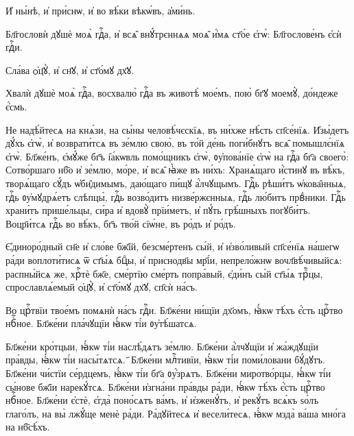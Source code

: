  И҆ ны́нѣ, и҆ при́снѡ, и҆ во вѣ́ки вѣкѡ́въ, а҆ми́нь. 
%

\hKv Бл҃гословѝ дꙋшѐ моѧ̀ гдⷭ҇а, и҆ всѧ̑ внꙋ́трєннѧѧ моѧ̑  и҆́мѧ ст҃о́е є҆гѡ̀: \hKv Бл҃гослове́нъ є҆сѝ гдⷭ҇и. 


\hKv Сла́ва ѻ҆ц҃ꙋ̀, и҆ сн҃ꙋ, и҆ ст҃о́мꙋ дх҃ꙋ.  

\hKv Хвалѝ дꙋшѐ моѧ̀ гдⷭ҇а, восхвалю̀ гдⷭ҇а въ животѣ̀ мое́мъ,  пою̀ бг҃ꙋ моемꙋ̀, до́ндеже є҆́смь. 
%

\hKv Не надѣ́йтесѧ на кнѧ́зи, на сы́ны человѣ́чєскїѧ, въ  ни́хже нѣ́сть сп҃се́нїѧ.  
\hKv И҆зы́детъ дꙋ́хъ є҆гѡ̀, и҆ возврати́тсѧ въ зе́млю  свою̀, въ то́й де́нь поги́бнꙋтъ всѧ̑ помышлє́нїѧ є҆гѡ̀.  
\hKv Бл҃же́нъ, є҆мꙋ́же бг҃ъ і҆а́кѡвль помо́щникъ є҆гѡ̀,  ᲂу҆пова́нїе є҆гѡ̀ на гдⷭ҇а бг҃а своего̀: 
\hKv Сотво́ршаго  нб҃о и҆ зе́млю, мо́ре, и҆ всѧ̑ ꙗ҆̀же въ ни́хъ: 
\hKv Хранѧ́щаго и҆́стинꙋ въ вѣ́къ, творѧ́щаго сꙋ́дъ ѡ҆би̑димымъ,  даю́щаго пи́щꙋ а҆́лчꙋщымъ. 
\hKv Гдⷭ҇ь рѣши́тъ ѡ҆кова̑нныѧ,  гдⷭ҇ь ᲂу҆мꙋдрѧ́етъ слѣпцы̀, гдⷭ҇ь возво́дитъ  низве́ржєнныѧ, гдⷭ҇ь лю́битъ првⷣники.  
\hKv Гдⷭ҇ь  храни́тъ прише́льцы, си́ра и҆ вдовꙋ̀ прїи́метъ, и҆ пꙋ́ть  грѣ́шныхъ погꙋби́тъ. 
\hKv Воцр҃и́тсѧ гдⷭ҇ь во вѣ́къ, бг҃ъ  тво́й сїѡ́не, въ ро́дъ и҆ ро́дъ.  
%

\hKv Є҆диноро́дный сн҃е и҆ сло́ве бж҃їй, безсме́ртенъ сы́й, и҆  и҆зво́ливый сп҃се́нїѧ на́шегѡ ра́ди воплоти́тисѧ ѿ ст҃ы́ѧ  бцⷣы, и҆ приснодв҃ы мр҃і́и, непрело́жнѡ вочл҃вѣ́чивыйсѧ:  распны́йсѧ же, хрⷭ҇тѐ бж҃е, сме́ртїю сме́рть попра́вый,  є҆ди́нъ сы́й ст҃ы́ѧ трⷪ҇цы, спрославлѧ́емый ѻ҆ц҃ꙋ̀, и҆  ст҃о́мꙋ дх҃ꙋ, сп҃сѝ на́съ.  
%

\hKv Во црⷭ҇твїи твое́мъ помѧнѝ на́съ гдⷭ҇и. \hKv Бл҃же́ни ни́щїи дх҃омъ, ꙗ҆́кѡ тѣ́хъ є҆́сть црⷭ҇тво  нбⷭ҇ное. 
\hKv Бл҃же́ни пла́чꙋщїи ꙗ҆́кѡ ті́и ᲂу҆тѣ́шатсѧ. 

 Бл҃же́ни кро́тцыи, ꙗ҆́кѡ ті́и наслѣ́дѧтъ  зе́млю. 
\hKv Бл҃же́ни а҆́лчꙋщїи и҆ жа́ждꙋщїи пра́вды, ꙗ҆́кѡ  ті́и насы́тѧтсѧ. 
҃ Бл҃же́ни млⷭ҇тивїи, ꙗ҆́кѡ ті́и поми́ловани  бꙋ́дꙋтъ. 
\hKv Бл҃же́ни чи́стїи се́рдцемъ, ꙗ҆́кѡ ті́и бг҃а  ᲂу҆́зрѧтъ.  
 Бл҃же́ни миротво́рцы, ꙗ҆́кѡ ті́и сы́нове  бж҃їи нарекꙋ́тсѧ. 
\hKv Бл҃же́ни и҆згна́ни пра́вды ра́ди,  ꙗ҆́кѡ тѣ́хъ є҆́сть црⷭ҇тво нбⷭ҇ное. 
 Бл҃же́ни є҆стѐ, є҆гда̀ поно́сѧтъ ва́мъ,  и҆ и҆зженꙋ́тъ, и҆ рекꙋ́тъ всѧ́къ ѕо́лъ глаго́лъ, на вы̀  лжꙋ́ще менѐ ра́ди. 
\hKv Ра́дꙋйтесѧ и҆ весели́тесѧ, ꙗ҆́кѡ  мзда̀ ва́ша мно́га на нб҃сѣ́хъ. 

